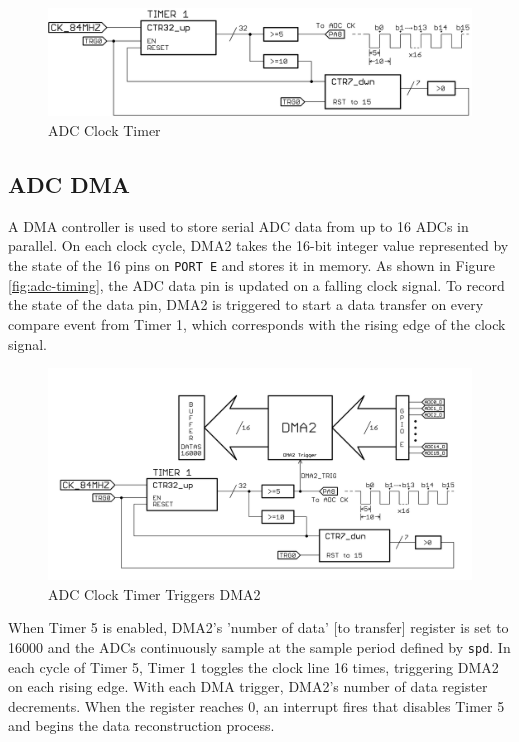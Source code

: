 \documentclass[11pt,twoside]{mitthesis}
\begin{document}
\begin{figure}[h!]
  \begin{center}
      \includegraphics[width=1\textwidth]{../tim1.png}
      \caption{ADC Clock Timer}
  \end{center}
\end{figure}


\subsection{ADC DMA}

A DMA controller is used to store serial ADC data from up to 16 ADCs in parallel.
On each clock cycle, DMA2 takes the 16-bit integer value represented by the state of the 16 pins on \texttt{PORT E} and stores it in memory. 
As shown in Figure \ref{fig:adc-timing}, the ADC data pin is updated on a falling clock signal.
To record the state of the data pin, DMA2 is triggered to start a data transfer on every compare event from Timer 1, which corresponds with the rising edge of the clock signal.

\begin{figure}[H]
  \begin{center}
      \includegraphics[width=1\textwidth]{../ADC-DMA.png}
      \caption{ADC Clock Timer Triggers DMA2}
  \end{center}
\end{figure}

When Timer 5 is enabled, DMA2's 'number of data' [to transfer] register is set to 16000  and the ADCs continuously sample at the sample period defined by \texttt{spd}.
In each cycle of Timer 5, Timer 1 toggles the clock line 16 times, triggering DMA2 on each rising edge.
With each DMA trigger, DMA2's number of data register decrements.
When the register reaches 0, an interrupt fires that disables Timer 5 and begins the data reconstruction process.
\end{document}
